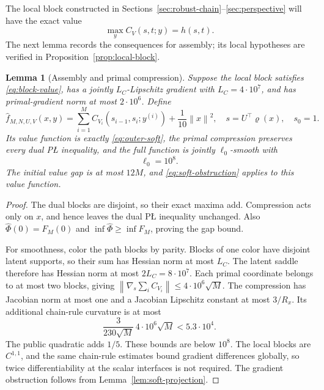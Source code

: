 \documentclass[11pt,a4paper]{article}
\newcommand{\norm}[1]{\left\lVert #1\right\rVert}
\newtheorem{lemma}[theorem]{Lemma}
\theoremstyle{definition}
\theoremstyle{remark}
\numberwithin{equation}{section}
\begin{document}
The local block constructed in
Sections~\ref{sec:robust-chain}--\ref{sec:perspective} will have the
exact value
\begin{equation}
 \max_y C_V(s,t;y)=h(s,t).
 \label{eq:block-value}
\end{equation}
The next lemma records the consequences for assembly; its local
hypotheses are verified in Proposition~\ref{prop:local-block}.

\begin{lemma}[Assembly and primal compression]
\label{lem:outer-compat}
Suppose the local block satisfies \eqref{eq:block-value}, has a jointly
$L_C$-Lipschitz gradient with $L_C=4\cdot10^7$, and has primal-gradient
norm at most $2\cdot10^6$. Define
\begin{equation}
 \widehat f_{M,N,U,V}(x,y)
 =\sum_{i=1}^M C_{V_i}(s_{i-1},s_i;y^{(i)})
   +\frac1{10}\norm x^2,
 \quad s=U^\top\varrho(x),\quad s_0=1.
 \label{eq:rotated-saddle}
\end{equation}
Its value function is exactly \eqref{eq:outer-soft}, the primal
compression preserves every dual P\L{} inequality, and the full
function is jointly $\ell_0$-smooth with
\begin{equation}
 \ell_0=10^8.
 \label{eq:ell0}
\end{equation}
The initial value gap is at most $12M$, and
\eqref{eq:soft-obstruction} applies to this value function.
\end{lemma}

\begin{proof}
The dual blocks are disjoint, so their exact maxima add. Compression
acts only on $x$, and hence leaves the dual P\L{} inequality unchanged.
Also $\widehat\Phi(0)=F_M(0)$ and
$\inf\widehat\Phi\ge\inf F_M$, proving the gap bound.

For smoothness, color the path blocks by parity. Blocks of one color
have disjoint latent supports, so their sum has Hessian norm at most
$L_C$. The latent saddle therefore has Hessian norm at most
$2L_C=8\cdot10^7$. Each primal coordinate belongs to at most two
blocks, giving
$\norm{\nabla_s\sum_iC_{V_i}}\le4\cdot10^6\sqrt M$.
The compression has Jacobian norm at most one and a Jacobian
Lipschitz constant at most $3/R_x$. Its additional chain-rule
curvature is at most
\[
 \frac3{230\sqrt M}\,4\cdot10^6\sqrt M<5.3\cdot10^4.
\]
The public quadratic adds $1/5$. These bounds are below $10^8$.
The local blocks are $C^{1,1}$, and the same chain-rule estimates
bound gradient differences globally, so twice differentiability at the
scalar interfaces is not required. The gradient obstruction follows from
Lemma~\ref{lem:soft-projection}.
\end{proof}
\end{document}
